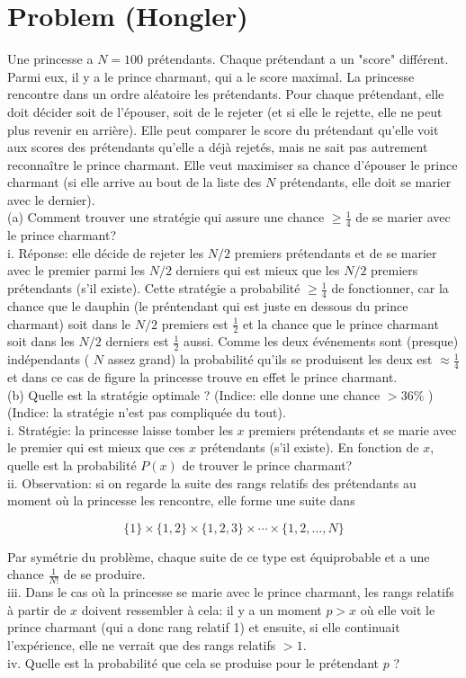 \documentclass[11pt, a4paper, oneside]{article}
\newcommand{\problem}[1][]{\section{#1} \hfill \par}
\theoremstyle{remark}
\theoremstyle{lemma}
\begin{document}
\newpage
\problem[Problem (Hongler)]
Une princesse a $N=100$ prétendants. Chaque prétendant a un "score" différent. Parmi eux, il y a le prince charmant, qui a le score maximal. La princesse rencontre dans un ordre aléatoire les prétendants. Pour chaque prétendant, elle doit décider soit de l'épouser, soit de le rejeter (et si elle le rejette, elle ne peut plus revenir en arrière). Elle peut comparer le score du prétendant qu'elle voit aux scores des prétendants qu'elle a déjà rejetés, mais ne sait pas autrement reconnaître le prince charmant. Elle veut maximiser sa chance d'épouser le prince charmant (si elle arrive au bout de la liste des $N$ prétendants, elle doit se marier avec le dernier).\\
(a) Comment trouver une stratégie qui assure une chance $\geq \frac{1}{4}$ de se marier avec le prince charmant?\\
i. Réponse: elle décide de rejeter les $N / 2$ premiers prétendants et de se marier avec le premier parmi les $N / 2$ derniers qui est mieux que les $N / 2$ premiers prétendants (s'il existe). Cette stratégie a probabilité $\geq \frac{1}{4}$ de fonctionner, car la chance que le dauphin (le préntendant qui est juste en dessous du prince charmant) soit dans le $N / 2$ premiers est $\frac{1}{2}$ et la chance que le prince charmant soit dans les $N / 2$ derniers est $\frac{1}{2}$ aussi. Comme les deux événements sont (presque) indépendants ( $N$ assez grand) la probabilité qu'ils se produisent les deux est $\approx \frac{1}{4}$ et dans ce cas de figure la princesse trouve en effet le prince charmant.\\
(b) Quelle est la stratégie optimale ? (Indice: elle donne une chance $>36 \%$ ) (Indice: la stratégie n'est pas compliquée du tout).\\
i. Stratégie: la princesse laisse tomber les $x$ premiers prétendants et se marie avec le premier qui est mieux que ces $x$ prétendants (s'il existe). En fonction de $x$, quelle est la probabilité $P(x)$ de trouver le prince charmant?\\
ii. Observation: si on regarde la suite des rangs relatifs des prétendants au moment où la princesse les rencontre, elle forme une suite dans

$$
\{1\} \times\{1,2\} \times\{1,2,3\} \times \cdots \times\{1,2, \ldots, N\}
$$

Par symétrie du problème, chaque suite de ce type est équiprobable et a une chance $\frac{1}{N!}$ de se produire.\\
iii. Dans le cas où la princesse se marie avec le prince charmant, les rangs relatifs à partir de $x$ doivent ressembler à cela: il y a un moment $p>x$ où elle voit le prince charmant (qui a donc rang relatif 1) et ensuite, si elle continuait l'expérience, elle ne verrait que des rangs relatifs $>1$.\\
iv. Quelle est la probabilité que cela se produise pour le prétendant $p$ ?
\end{document}
